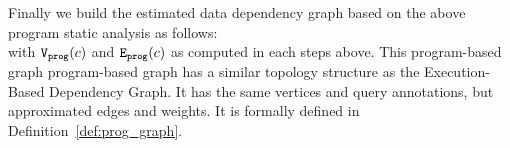 Finally we build the estimated data dependency graph based on the above program static analysis as follows:
\\
\highlight{
  \[
    \progG(c) = (\progV(c), \progE(c))
    \]
}
with $\mathtt{{V_{prog}}}(c)$ and  $\mathtt{{E_{prog}}}(c)$
as computed in each steps above.
%
This program-based graph program-based graph has a similar topology structure as 
the Execution-Based Dependency Graph. It has the same
vertices and query annotations, but approximated edges and weights.  
It is formally defined in Definition~\ref{def:prog_graph}.
